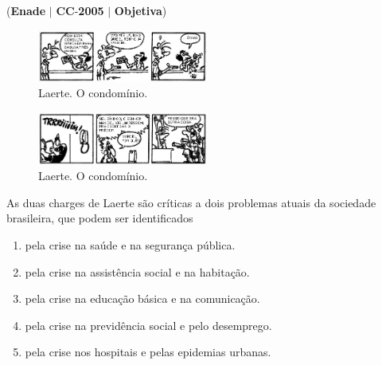\documentclass{exam}
\begin{document}
\begin{questions}
\question (\textbf{Enade} $|$ \textbf{CC}-\textbf{2005} $|$ \textbf{Objetiva})

\begin{figure}[H]
	\begin{center}
		\includegraphics[width=0.5\textwidth]{CIENCIA_DA_COMPUTACAO_Prova2005-utf8_figuras/fig-0002.jpg}
		\caption{Laerte. O condomínio.}
	\end{center}
\end{figure}

\begin{figure}[H]
	\begin{center}
		\includegraphics[width=0.5\textwidth]{CIENCIA_DA_COMPUTACAO_Prova2005-utf8_figuras/fig-0003.jpg}
		\caption{Laerte. O condomínio.}
	\end{center}
\end{figure}

As duas charges de Laerte são críticas a dois problemas atuais da sociedade brasileira, que podem ser identificados
	\begin{enumerate}[label=\alph*)]
		\item  pela crise na saúde e na segurança pública.
		\item  pela crise na assistência social e na habitação.
		\item  pela crise na educação básica e na comunicação.
		\item  pela crise na previdência social e pelo desemprego.
		\item  pela crise nos hospitais e pelas epidemias urbanas.
	\end{enumerate}


\end{questions}
\end{document}
